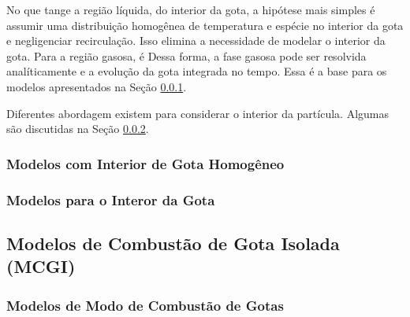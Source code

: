 No que tange a região líquida, do interior da gota, a hipótese mais simples é assumir uma distribuição homogênea de temperatura e espécie no interior da gota e negligenciar recirculação.
Isso elimina a necessidade de modelar o interior da gota.
Para a região gasosa, é 
Dessa forma, a fase gasosa pode ser resolvida analíticamente e a evolução da gota integrada no tempo.
Essa é a base para os modelos apresentados na Seção \ref{sec:RMM}.

Diferentes abordagem existem para considerar o interior da partícula.
Algumas são discutidas na Seção \ref{sec:int}.


\subsubsection{Modelos com Interior de Gota Homogêneo} \label{sec:RMM}

% 
% 




\subsubsection{Modelos para o Interor da Gota} \label{sec:int}


\subsection{Modelos de Combustão de Gota Isolada (MCGI)} \label{sec:MCGI}




\subsubsection{Modelos de Modo de Combustão de Gotas}